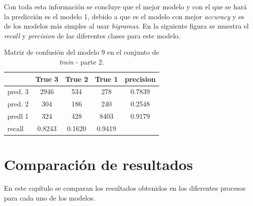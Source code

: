 \documentclass[es]{uc3mreport}
\begin{document}
\begin{report}
    Con toda esta información se concluye que el mejor modelo y con el que se
    hará la predicción es el modelo 1, debido a que es el modelo con mejor
    \textit{accuracy} y es de los modelos más simples al usar \textit{bigramas}.
    En la siguiente figura se muestra el \textit{recall} y \textit{precision} de
    las diferentes clases para este modelo.

\begin{table}
\begin{tabular}{@{}lccc|c@{}}
    \toprule
             & True 3 & True 2 & True 1 & precision\\
    \midrule
    pred. 3  & 2946   & 534    & 278    & 0.7839   \\
    pred. 2  & 304    & 186    & 240    & 0.2548   \\
    predl 1  & 324    & 428    & 8403   & 0.9179   \\
    \midrule
    recall   & 0.8243 & 0.1620 & 0.9419 &          \\
    \bottomrule
\end{tabular}
\caption{Matriz de confusión del modelo 9 en el conjunto de \textit{train} -
parte 2.}
\end{table}


\section{Comparación de resultados}
\label{chap:resultados}

En este capítulo se comparan los resultados obtenidos en los diferentes procesos para cada uno de los modelos.


\end{report}
\end{document}
